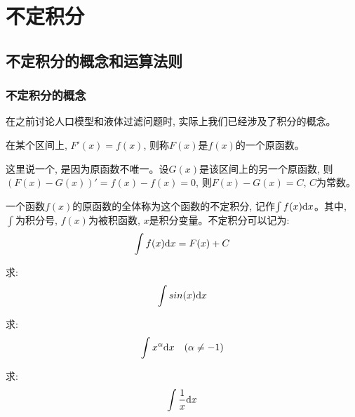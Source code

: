 \chapter{不定积分}
\section{不定积分的概念和运算法则}
\subsection{不定积分的概念}
在之前讨论人口模型和液体过滤问题时, 实际上我们已经涉及了积分的概念。
\begin{definition}
    在某个区间上, $F'(x) = f(x)$, 则称$F(x)$是$f(x)$的一个原函数。
\end{definition}
\begin{remark}
    这里说一个, 是因为原函数不唯一。设$G(x)$是该区间上的另一个原函数, 则$(F(x)-G(x))' = f(x) - f(x) = 0$, 则$F(x) - G(x) = C$, $C$为常数。
\end{remark}

\begin{definition}
    一个函数$f(x)$的原函数的全体称为这个函数的不定积分, 记作$\int f(x)\mathrm{d} x$。其中, $\int$为积分号, $f(x)$为被积函数, $x$是积分变量。不定积分可以记为:
    \begin{equation*}
        \int f(x) \mathrm{d} x = F(x) + C
    \end{equation*}
\end{definition}

\begin{example}
    求:
    \begin{equation*}
        \int sin(x) \mathrm{d} x
    \end{equation*}
\end{example}
\begin{solution}
    
\end{solution}

\begin{example}
    求:
    \begin{equation*}
        \int x^\alpha \mathrm{d} x \quad (\alpha \neq -1)
    \end{equation*}
\end{example}
\begin{solution}
    
\end{solution}

\begin{example}
    求:
    \begin{equation*}
        \int \frac{1}{x} \mathrm{d} x
    \end{equation*}
\end{example}
\begin{solution}
    
\end{solution}

